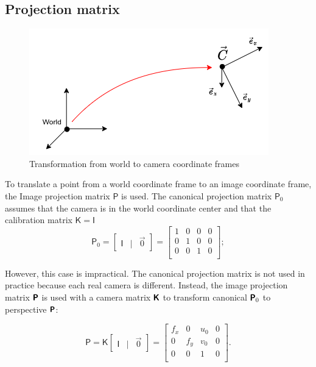 \subsection{Projection matrix}

\begin{figure}[h]
    \centering
    \includegraphics[width=.5\textwidth]{graphics/frames.png}
    \caption{Transformation from world to camera coordinate frames}
    \label{fig:frames}
\end{figure}

To translate a point from a world coordinate frame to an image coordinate frame, the Image projection matrix $\pmb{\mathsf{P}}$ is used. 
The canonical projection matrix $\pmb{\mathsf{P}}_0$ assumes that the camera is in the world coordinate center and that the calibration matrix $\pmb{\mathsf{K}} = \pmb{\mathsf{I}}$
\begin{equation}
\pmb{\mathsf{P}}_0 = \begin{bmatrix} \pmb{\mathsf{I}} & | & \vec{0} \end{bmatrix} = 
    \begin{bmatrix}
    1 & 0 & 0 & 0 \\
    0 & 1 & 0 & 0 \\
    0 & 0 & 1 & 0 \\
    \end{bmatrix};
\end{equation}

However, this case is impractical. 
The canonical projection matrix is not used in practice because each real camera is different. 
Instead, the image projection matrix $\pmb{\mathsf{P}}$ is used with a camera matrix $\pmb{\mathsf{K}}$ to transform canonical $\pmb{\mathsf{P}}_0$ to perspective $\pmb{\mathsf{P}}$:

\begin{equation}
\pmb{\mathsf{P}} = \pmb{\mathsf{K}} \begin{bmatrix} \pmb{\mathsf{I}} & | & \vec{0} \end{bmatrix} = 
    \begin{bmatrix} 
    f_x & 0 & u_0 & 0 \\
    0 & f_y & v_0 & 0 \\ 
    0 & 0 & 1 & 0 \\
    \end{bmatrix}.
\end{equation}

